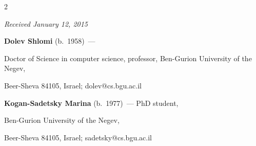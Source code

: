 \begin{multicols}{2}
{{ } }





\end{multicols}





\vspace*{-3pt}





\hfill{\small\textit{Received January 12, 2015}}





\vspace*{-24pt}





\Contr





\noindent


\textbf{Dolev Shlomi} (b.\ 1958)~---


Doctor of Science in computer science, professor, Ben-Gurion University of the Negev,


Beer-Sheva 84105, Israel; dolev@cs.bgu.ac.il





\vspace*{3pt}





\noindent


\textbf{Kogan-Sadetsky Marina} (b.\ 1977)~--- PhD student,


Ben-Gurion University of the Negev,


Beer-Sheva 84105, Israel; sadetsky@cs.bgu.ac.il





\vspace*{10pt}






